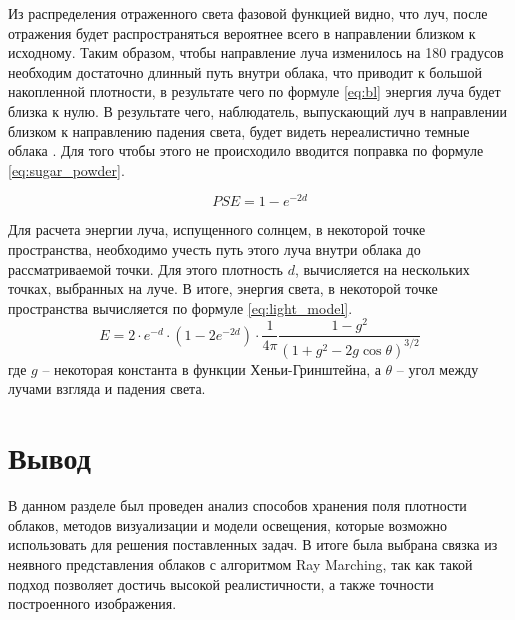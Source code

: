 Из распределения отраженного света фазовой функцией видно, что луч, после отражения будет распространяться вероятнее всего в направлении близком к исходному. 
Таким образом, чтобы направление луча изменилось на 180 градусов необходим достаточно длинный путь внутри облака, что приводит к большой накопленной плотности, в результате чего по формуле \ref{eq:bl} энергия луча будет близка к нулю. 
В результате чего, наблюдатель, выпускающий луч в направлении близком к направлению падения света, будет видеть нереалистично темные облака \cite{hzd}. Для того чтобы этого не происходило вводится поправка по формуле \eqref{eq:sugar_powder}.

\begin{equation}
	\label{eq:sugar_powder}
	PSE = 1 - e ^ {-2 d}
\end{equation}

Для расчета энергии луча, испущенного солнцем, в некоторой точке пространства, необходимо учесть путь этого луча внутри облака до рассматриваемой точки.
Для этого плотность $d$, вычисляется на нескольких точках, выбранных на луче.
В итоге, энергия света, в некоторой точке пространства вычисляется по формуле \eqref{eq:light_model}.
\begin{equation}
	\label{eq:light_model}
	E = 2 \cdot e ^ {-d} \cdot (1 - 2 e ^ {-2d}) \cdot \frac{1}{4\pi} \frac{1 - g^2}{(1 + g^2 - 2g\cos \theta)^{3/2}}
\end{equation}
где $ g $ -- некоторая константа в функции Хеньи-Гринштейна, а $ \theta $ -- угол между лучами взгляда и падения света.


\section*{Вывод}

В данном разделе был проведен анализ способов хранения поля плотности облаков, методов визуализации и модели освещения, которые возможно использовать для решения поставленных задач. В итоге была выбрана связка из неявного представления облаков с алгоритмом Ray Marching, так как такой подход позволяет достичь высокой реалистичности, а также точности построенного изображения. 








